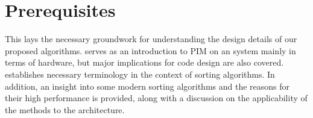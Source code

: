 \chapter{Prerequisites}
\label{sec:prereq}

This  lays the necessary groundwork for understanding the design details of our proposed algorithms.
 serves as an introduction to \acl{PIM} on an \upmem{} system mainly in terms of hardware, but major implications for code design are also covered.
 establishes necessary terminology in the context of sorting algorithms.
In addition, an insight into some modern sorting algorithms and the reasons for their high performance is provided, along with a discussion on the applicability of the methods to the \upmem{} architecture.




